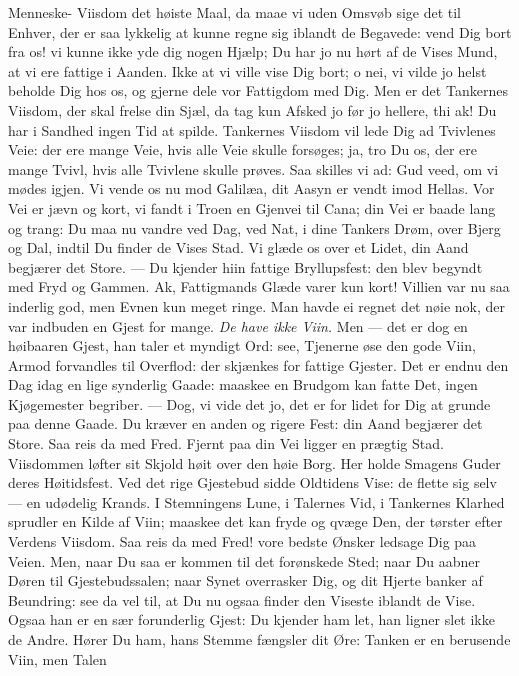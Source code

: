 \documentclass[12pt,a4paper]{book}
\begin{document}
Menneske-%
Viisdom det høiste Maal, da maae vi uden Omsvøb sige det til Enhver, der er saa lykkelig at
kunne regne sig iblandt de Begavede: vend Dig bort fra os! vi kunne ikke yde dig nogen
Hjælp; Du har jo nu hørt af de Vises Mund, at vi ere fattige i Aanden. Ikke at vi ville
vise Dig bort; o nei, vi vilde jo helst beholde Dig hos os, og gjerne dele vor Fattigdom
med Dig. Men er det Tankernes Viisdom, der skal frelse din Sjæl, da tag kun Afsked jo før
jo hellere, thi ak! Du har i Sandhed ingen Tid at spilde. Tankernes Viisdom vil lede Dig ad
Tvivlenes Veie: der ere mange Veie, hvis alle Veie skulle forsøges; ja, tro Du os, der ere
mange Tvivl, hvis alle Tvivlene skulle prøves. Saa skilles vi ad: Gud veed, om vi mødes
igjen. Vi vende os nu mod Galilæa, dit Aasyn er vendt imod Hellas. Vor Vei er jævn og kort,
vi fandt i Troen en Gjenvei til Cana; din Vei er baade lang og trang: Du maa nu vandre ved
Dag, ved Nat, i dine Tankers Drøm, over Bjerg og Dal, indtil Du finder de Vises Stad. Vi
glæde os over et Lidet, din Aand begjærer det Store. --- Du kjender hiin fattige
Bryllupsfest: den blev begyndt med Fryd og Gammen. Ak, Fattigmands Glæde varer kun kort!
Villien var nu saa inderlig god, men Evnen kun meget ringe. Man havde ei regnet det nøie
nok, der var indbuden en Gjest for mange. \emph{De have ikke Viin.} Men --- det er dog en
høibaaren Gjest, han taler et myndigt Ord: see, Tjenerne øse den gode Viin, Armod
forvandles til Overflod: der skjænkes for fattige Gjester. Det er endnu den Dag idag en
lige synderlig Gaade: maaskee en Brudgom kan fatte Det, ingen Kjøgemester begriber. --- Dog,
vi vide det jo, det er for lidet for Dig at grunde paa denne Gaade. Du kræver en anden og
rigere Fest: din Aand begjærer det Store. Saa reis da med Fred. Fjernt paa din Vei ligger
en prægtig Stad. Viisdommen løfter sit Skjold høit over den høie Borg. Her holde Smagens
Guder
deres Høitidsfest. Ved det rige Gjestebud sidde Oldtidens Vise: de flette sig selv --- en
udødelig Krands. I Stemningens Lune, i Talernes Vid, i Tankernes Klarhed sprudler en Kilde
af Viin; maaskee det kan fryde og qvæge Den, der tørster efter Verdens Viisdom. Saa reis da
med Fred! vore bedste Ønsker ledsage Dig paa Veien. Men, naar Du saa er kommen til det
forønskede Sted; naar Du aabner Døren til Gjestebudssalen; naar Synet overrasker Dig, og
dit Hjerte banker af Beundring: see da vel til, at Du nu ogsaa finder den Viseste iblandt
de Vise. Ogsaa han er en sær forunderlig Gjest: Du kjender ham let, han ligner slet ikke de
Andre. Hører Du ham, hans Stemme fængsler dit Øre: Tanken er en berusende Viin, men Talen
\end{document}
